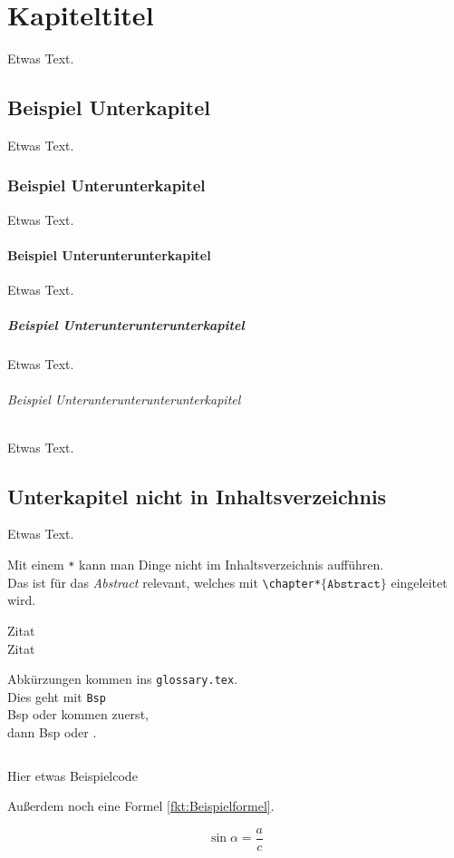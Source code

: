 \chapter{Kapiteltitel}
Etwas Text.
\section{Beispiel Unterkapitel}
Etwas Text.
\subsection{Beispiel Unterunterkapitel}
Etwas Text.
\subsubsection{Beispiel Unterunterunterkapitel}
Etwas Text.
\paragraph{Beispiel Unterunterunterunterkapitel}         %
Etwas Text.
\subparagraph{Beispiel Unterunterunterunterunterkapitel} %
Etwas Text.
\section*{Unterkapitel nicht in Inhaltsverzeichnis}      %
Etwas Text.

Mit einem \texttt{*} kann man Dinge nicht im Inhaltsverzeichnis aufführen.\\
Das ist für das \emph{Abstract} relevant, welches mit \texttt{\textbackslash chapter*}\(\{\texttt{Abstract}\}\) eingeleitet wird.

Zitat\cite{zitat}\\
Zitat\cite[10-20]{zitat}

\newpage

Abkürzungen kommen ins \texttt{glossary.tex}.\\
Dies geht mit \texttt{\acrfull{Bsp}}\\
\acrfull{Bsp} oder  kommen zuerst,\\
dann \acrshort{Bsp} oder .

\begin{listing}[H]
    \inputminted{python}{code/beispielcode.py}
    \caption{Hier etwas Beispielcode}
    \label{lst:beispielcode.py}
\end{listing}
Außerdem noch eine Formel \ref{fkt:Beispielformel}.

\begin{equation}
    \sin \alpha = \frac{a}{c}
    \label{fkt:Beispielformel}
\end{equation}

